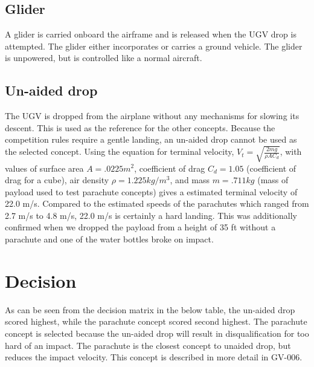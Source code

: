 \documentclass[]{auvsi_doc}
\begin{document}
\subsection{Glider}
A glider is carried onboard the airframe and is released when the UGV drop is attempted. The glider either incorporates or carries a ground vehicle. The glider is unpowered, but is controlled like a normal aircraft. 

\subsection{Un-aided drop}
The UGV is dropped from the airplane without any mechanisms for slowing its descent. This is used as the reference for the other concepts. Because the competition rules require a gentle landing, an un-aided drop cannot be used as the selected concept. Using the equation for terminal velocity, $V_t = \sqrt{\frac{2mg}{\rho A C_d}}$, with values of  surface area $A = .0225 m^2$, coefficient of drag $C_d = 1.05$ (coefficient of drag for a cube), air density $\rho = 1.225 kg/m^3$, and mass $m = .711 kg$ (mass of payload used to test parachute concepts) gives a estimated terminal velocity of 22.0 m/s. Compared to the estimated speeds of the parachutes which ranged from 2.7 m/s to 4.8 m/s, 22.0 m/s is certainly a hard landing. This was additionally confirmed when we dropped the payload from a height of 35 ft without a parachute and one of the water bottles broke on impact.

\section{Decision}

As can be seen from the decision matrix in the below table, the un-aided drop scored highest, while the parachute concept scored second highest. The parachute concept is selected because the un-aided drop will result in disqualification for too hard of an impact. The parachute is the closest concept to unaided drop, but reduces the impact velocity. This concept is described in more detail in GV-006.
\end{document}

